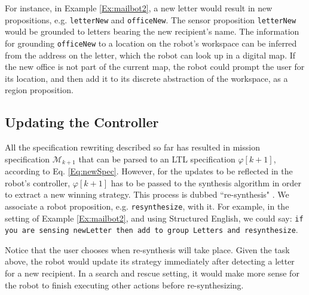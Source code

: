 For instance, in Example \ref{Ex:mailbot2}, a new letter would result in new propositions, e.g. \texttt{letterNew} and \texttt{officeNew}. The sensor proposition \texttt{letterNew} would be grounded to letters bearing the new recipient's name. The information for grounding \texttt{officeNew} to a location on the robot's workspace can be inferred from the address on the letter, which the robot can look up in a digital map. If the new office is not part of the current map, the robot could prompt the user for its location, and then add it to its discrete abstraction of the workspace, as a region proposition.

\subsection{Updating the Controller}

All the specification rewriting described so far has resulted in mission specification $\mathcal{M}_{k+1}$ that can be parsed to an LTL specification $\varphi [k+1]$, according to Eq. \eqref{Eq:newSpec}. However, for the updates to be reflected in the robot's controller, $\varphi [k+1]$ has to be passed to the synthesis algorithm in order to extract a new winning strategy. This process is dubbed ``re-synthesis" \cite{BingxinRSS2012}. We associate a robot proposition, e.g. \texttt{resynthesize}, with it. For example, in the setting of Example \ref{Ex:mailbot2}, and using Structured English, we could say:
\texttt{if you are sensing newLetter then add to group Letters and resynthesize}. 

Notice that the user chooses when re-synthesis will take place. Given the task above, the robot would update its strategy immediately after detecting a letter for a new recipient. In a search and rescue setting, it would make more sense for the robot to finish executing other actions before re-synthesizing.

